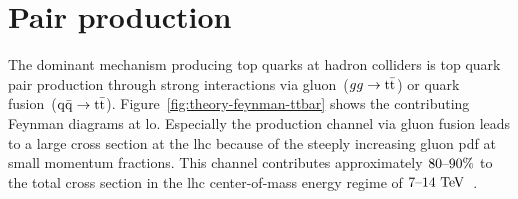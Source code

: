 \section{Pair production}
\label{sec:theory-ttbar-production}

The dominant mechanism producing top quarks at hadron colliders is top quark pair production through strong interactions via gluon~($gg\to\mathrm{t}\bar{\mathrm{t}}$) or quark fusion~($\mathrm{q}\bar{\mathrm{q}}\to\mathrm{t}\bar{\mathrm{t}}$). Figure~\ref{fig:theory-feynman-ttbar} shows the contributing Feynman diagrams at \gls{lo}. Especially the production channel via gluon fusion leads to a large cross section at the \gls{lhc} because of the steeply increasing gluon \gls{pdf} at small momentum fractions. This channel contributes approximately $80\text{--}90\%$ to the total cross section in the \gls{lhc} center-of-mass energy regime of $7\text{--}14~\mathrm{TeV}$~\cite{Olive:2016xmw}. 


